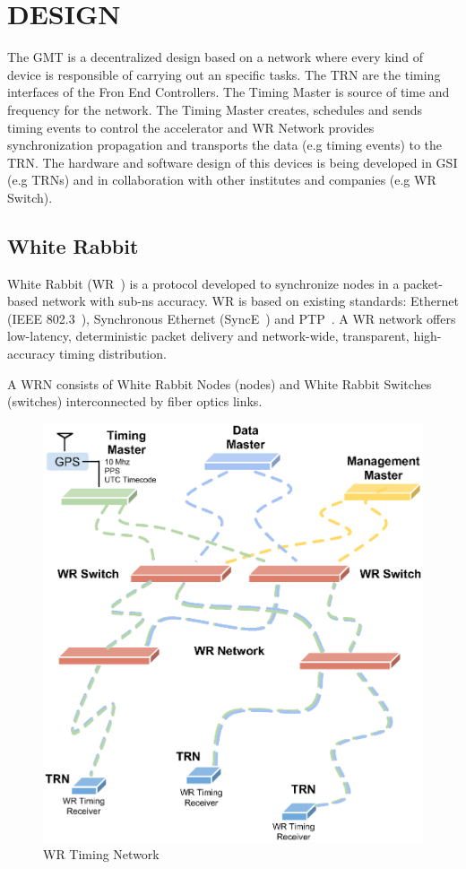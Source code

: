 \section{DESIGN}

The GMT is a decentralized design based on a network where every kind of device
is responsible of
carrying out an specific tasks. The TRN are the timing interfaces of the Fron End
Controllers. The Timing Master is source of time and frequency for the network.
The Timing Master creates, schedules and sends timing events to control the accelerator
and WR Network provides synchronization propagation and transports the data (e.g timing events) to the TRN. 
The hardware and software design of this devices is being developed in GSI (e.g TRNs) and in
collaboration with other institutes and companies (e.g WR Switch). 

\subsection{White Rabbit}

White Rabbit (WR~\cite{wr}) is a protocol developed to
synchronize nodes in a packet-based network with sub-ns accuracy. WR is based 
on existing standards: Ethernet (IEEE 802.3~\cite{internet}),
Synchronous Ethernet (SyncE~\cite{sync}) and PTP~\cite{ptp}. 
A WR network offers low-latency, deterministic packet delivery and network-wide, 
transparent, high-accuracy timing distribution. 

A WRN consists of White Rabbit Nodes (nodes) and White
Rabbit Switches (switches) interconnected by fiber optics links. 

\begin{figure}[htb]
   \centering
   \includegraphics*[scale=0.5]{fig/icaleps_networ.eps}
   \caption{WR Timing Network}
   \label{network}
\end{figure}


